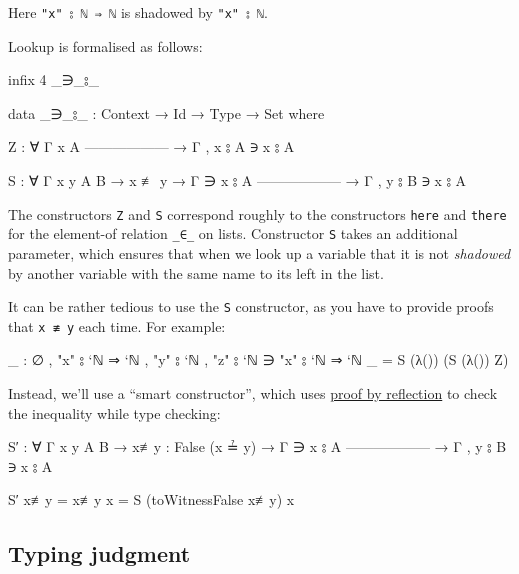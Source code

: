 Here \texttt{"x"\ ⦂\ \textasciigrave{}ℕ\ ⇒\ \textasciigrave{}ℕ} is
shadowed by \texttt{"x"\ ⦂\ \textasciigrave{}ℕ}.

Lookup is formalised as follows:

\begin{fence}
\begin{code}
infix  4  _∋_⦂_

data _∋_⦂_ : Context → Id → Type → Set where

  Z : ∀ {Γ x A}
      ------------------
    → Γ , x ⦂ A ∋ x ⦂ A

  S : ∀ {Γ x y A B}
    → x ≢ y
    → Γ ∋ x ⦂ A
      ------------------
    → Γ , y ⦂ B ∋ x ⦂ A
\end{code}
\end{fence}

The constructors \texttt{Z} and \texttt{S} correspond roughly to the
constructors \texttt{here} and \texttt{there} for the element-of
relation \texttt{\_∈\_} on lists. Constructor \texttt{S} takes an
additional parameter, which ensures that when we look up a variable that
it is not \emph{shadowed} by another variable with the same name to its
left in the list.

It can be rather tedious to use the \texttt{S} constructor, as you have
to provide proofs that \texttt{x\ ≢\ y} each time. For example:

\begin{fence}
\begin{code}
_ : ∅ , "x" ⦂ `ℕ ⇒ `ℕ , "y" ⦂ `ℕ , "z" ⦂ `ℕ ∋ "x" ⦂ `ℕ ⇒ `ℕ
_ = S (λ()) (S (λ()) Z)
\end{code}
\end{fence}

Instead, we'll use a ``smart constructor'', which uses
\protect\hyperlink{Decidable-proof-by-reflection}{proof by reflection}
to check the inequality while type checking:

\begin{fence}
\begin{code}
S′ : ∀ {Γ x y A B}
   → {x≢y : False (x ≟ y)}
   → Γ ∋ x ⦂ A
     ------------------
   → Γ , y ⦂ B ∋ x ⦂ A

S′ {x≢y = x≢y} x = S (toWitnessFalse x≢y) x
\end{code}
\end{fence}

\hypertarget{typing-judgment}{%
\subsection{Typing judgment}\label{typing-judgment}}

